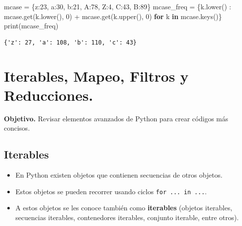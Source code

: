 \documentclass[
  spanish,
  letterpaper,
]{scrbook}
\newenvironment{Shaded}{\begin{snugshade}}{\end{snugshade}}
\newcommand{\BuiltInTok}[1]{\textcolor[rgb]{0.00,0.23,0.31}{#1}}
\newcommand{\ControlFlowTok}[1]{\textcolor[rgb]{0.00,0.23,0.31}{\textbf{#1}}}
\newcommand{\DecValTok}[1]{\textcolor[rgb]{0.68,0.00,0.00}{#1}}
\newcommand{\KeywordTok}[1]{\textcolor[rgb]{0.00,0.23,0.31}{\textbf{#1}}}
\newcommand{\NormalTok}[1]{\textcolor[rgb]{0.00,0.23,0.31}{#1}}
\newcommand{\OperatorTok}[1]{\textcolor[rgb]{0.37,0.37,0.37}{#1}}
\newcommand{\StringTok}[1]{\textcolor[rgb]{0.13,0.47,0.30}{#1}}
\providecommand{\tightlist}{%
  \setlength{\itemsep}{0pt}\setlength{\parskip}{0pt}}
\theoremstyle{definition}
\theoremstyle{remark}
\begin{document}
\begin{Shaded}
\begin{Highlighting}[]
\NormalTok{mcase }\OperatorTok{=}\NormalTok{ \{}\StringTok{\textquotesingle{}z\textquotesingle{}}\NormalTok{:}\DecValTok{23}\NormalTok{, }\StringTok{\textquotesingle{}a\textquotesingle{}}\NormalTok{:}\DecValTok{30}\NormalTok{, }\StringTok{\textquotesingle{}b\textquotesingle{}}\NormalTok{:}\DecValTok{21}\NormalTok{, }\StringTok{\textquotesingle{}A\textquotesingle{}}\NormalTok{:}\DecValTok{78}\NormalTok{, }\StringTok{\textquotesingle{}Z\textquotesingle{}}\NormalTok{:}\DecValTok{4}\NormalTok{, }\StringTok{\textquotesingle{}C\textquotesingle{}}\NormalTok{:}\DecValTok{43}\NormalTok{, }\StringTok{\textquotesingle{}B\textquotesingle{}}\NormalTok{:}\DecValTok{89}\NormalTok{\}}
\NormalTok{mcase\_freq }\OperatorTok{=}\NormalTok{ \{k.lower() : }
\NormalTok{              mcase.get(k.lower(), }\DecValTok{0}\NormalTok{) }\OperatorTok{+}\NormalTok{ mcase.get(k.upper(), }\DecValTok{0}\NormalTok{)}
              \ControlFlowTok{for}\NormalTok{ k }\KeywordTok{in}\NormalTok{ mcase.keys()\}}
\BuiltInTok{print}\NormalTok{(mcase\_freq)}
\end{Highlighting}
\end{Shaded}

\begin{verbatim}
{'z': 27, 'a': 108, 'b': 110, 'c': 43}
\end{verbatim}

\chapter{Iterables, Mapeo, Filtros y
Reducciones.}\label{sec-s-iter-map-fil-red}

\textbf{Objetivo.} Revisar elementos avanzados de Python para crear
códigos más concisos.

\section{Iterables}\label{iterables-1}

\begin{itemize}
\tightlist
\item
  En Python existen objetos que contienen secuencias de otros objetos.
\item
  Estos objetos se pueden recorrer usando ciclos
  \texttt{for\ ...\ in\ ...}.
\item
  A estos objetos se les conoce también como \textbf{iterables} (objetos
  iterables, secuencias iterables, contenedores iterables, conjunto
  iterable, entre otros).
\end{itemize}
\end{document}
